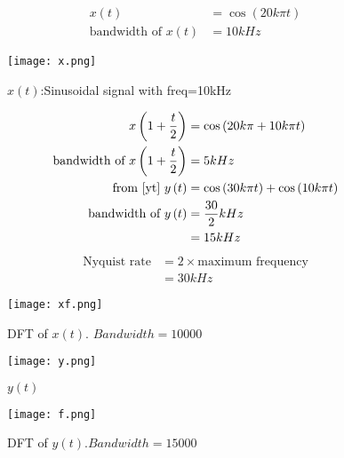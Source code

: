 \documentclass{beamer}
\providecommand{\brak}[1]{\ensuremath{\left(#1\right)}}
\begin{document}
\begin{frame}
\begin{align}
  x\brak{t}&=\cos{\brak{20k\pi t}}\\
    \text{bandwidth of } x\brak{t} &= 10 kHz  
\end{align}
 \begin{figure}[!h]
 \centering
 \texttt{[image: x.png]}
 \caption{$x\brak{t}$:Sinusoidal signal with freq=10kHz}
\end{figure}
\end{frame}
\begin{frame}
\begin{align}
     x\brak{1+\frac{t}{2}} &= \cos{\brak{20k\pi+10k\pi t}}\\
    \text{bandwidth of } x\brak{1+\frac{t}{2}} &=  5 kHz\\
    \text{from \eqref{yt} } 
    y\brak{t}&= \cos{\brak{30k\pi t}}+\cos{\brak{10k\pi t}}\\
    \text{bandwidth of } y\brak{t} &= \frac{30}{2} kHz\\
    &= 15 kHz
\end{align}
\begin{align}
    \text{Nyquist rate} &= 2 \times \text{maximum frequency}\\
    &= 30 kHz
\end{align} 
\end{frame}
\begin{frame}
    \begin{figure}[!h]
 \centering
 \texttt{[image: xf.png]}
 \caption{DFT of $x\brak{t}$. $Bandwidth=10000$}
\end{figure}
\end{frame}
\begin{frame}
   \begin{figure}[!h]
 \centering
 \texttt{[image: y.png]}
 \caption{$y\brak{t}$}
\end{figure}
\begin{figure}[!h]
 \centering
 \texttt{[image: f.png]}
 \caption{DFT of $y\brak{t}$.$Bandwidth=15000$}
\end{figure} 
\end{frame}
\end{document}
